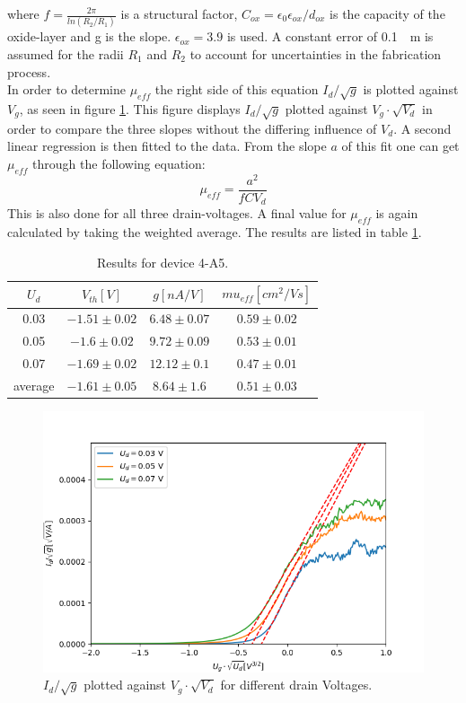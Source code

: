 \documentclass[%
 reprint,
amsmath,amssymb,
pra,
]{revtex4-1}
\begin{document}
where $f = \frac{2\pi}{ln(R_2/R_1)}$ is a structural factor, $C_{ox} = \epsilon_0 \epsilon_{ox} / d_{ox}$ is the capacity of the oxide-layer and g is the slope. $\epsilon_{ox} = 3.9$ is used. A constant error of \SI{0.1}{\mu m} is assumed for the radii $R_1$ and $R_2$ to account for uncertainties in the fabrication process.\\
In order to determine  $\mu_{eff}$ the right side of this equation $I_d/\sqrt{g}$ is plotted against $V_g$, as seen in figure \ref{fig:linreg2}. This figure displays $I_d/\sqrt{g}$ plotted against $V_g \cdot \sqrt{V_d}$ in order to compare the three slopes without the differing influence of $V_d$. A second linear regression is then fitted to the data. From the slope $a$ of this fit one can get $\mu_{eff}$ through the following equation:
\begin{equation}
\mu_{eff} = \dfrac{a^2}{f C V_d}
\end{equation}
This is also done for all three drain-voltages. A final value for $\mu_{eff}$ is again calculated by taking the weighted average. The results are listed in table \ref{tab: exaple_data}.

\begin{table}
\centering
\begin{tabular}{|c|c|c|c|}
\hline
$U_d$ & $V_{th}[\si{V}]$ & $g[\si{nA/V}]$ & $mu_{eff}[\si{cm^2/Vs}]$\\
\hline
0.03 & $-1.51\pm 0.02$ & $6.48\pm 0.07$ & $0.59\pm 0.02$\\
\hline
0.05 & $-1.6\pm 0.02$ & $9.72\pm 0.09$ & $0.53\pm 0.01$\\
\hline
0.07 & $-1.69\pm 0.02$ & $12.12\pm 0.1$ & $0.47\pm 0.01$\\
\hline
average & $-1.61\pm 0.05$ & $8.64\pm 1.6$ &$0.51\pm 0.03$\\
\hline
\end{tabular}
\label{tab: exaple_data}
\caption{Results for device 4-A5.}
\end{table}



\begin{figure}
\centering
\includegraphics[scale=0.6]{Bilder/mu.png}
\caption{$I_d/\sqrt{g}$ plotted against $V_g \cdot \sqrt{V_d}$ for different drain Voltages.}
\label{fig:linreg2}
\end{figure}
\end{document}

